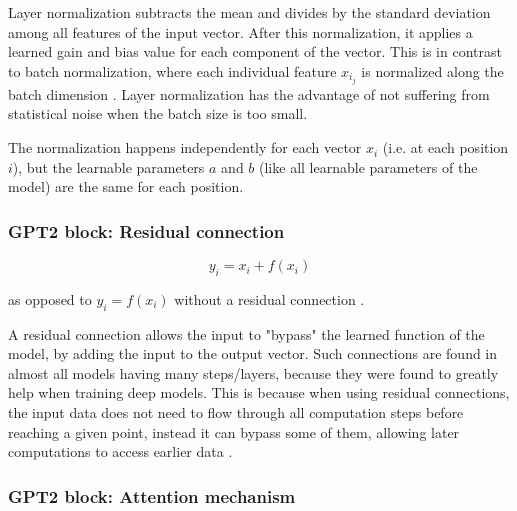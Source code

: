Layer normalization subtracts the mean and divides by the standard deviation among all features of the input vector.
After this normalization, it applies a learned gain and bias value for each component of the vector.
This is in contrast to batch normalization, where each individual feature $x_{i_j}$ is normalized along the batch dimension .
Layer normalization has the advantage of not suffering from statistical noise when the batch size is too small.

The normalization happens independently for each vector $x_i$ (i.e. at each position $i$), but the learnable parameters $a$ and $b$ (like all learnable parameters of the model) are the same for each position.

\subsubsection{GPT2 block: Residual connection}

\begin{samepage}

$$y_i = x_i + f(x_i)$$

as opposed to $y_i = f(x_i)$ without a residual connection \cite[p. 3]{allyouneed} \cite{residual}.

A residual connection allows the input to "bypass" the learned function of the model, by adding the input to the output vector.
Such connections are found in almost all models having many steps/layers, because they were found to greatly help when training deep models.
This is because when using residual connections, the input data does not need to flow through all computation steps before reaching a given point, instead it can bypass some of them, allowing later computations to access earlier data .

\end{samepage}

\subsubsection{GPT2 block: Attention mechanism}




